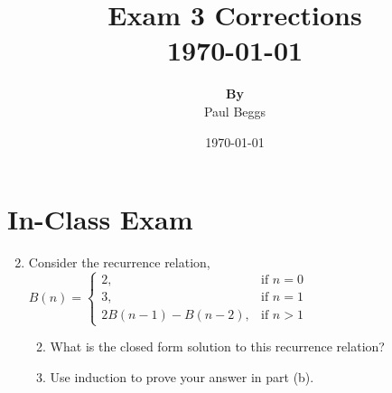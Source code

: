 \documentclass[10pt]{article}
\title{
  Exam 3 Corrections \\[1ex]
  \large \today
}
\author{\textbf{By} \\ 
Paul Beggs}
\date{\today} %
\newenvironment{solution}{\textit{Solution}.}
\newcommand{\solex}[1]{
    \vspace{5pt}
    \begin{solution}
    #1
    \end{solution}
}
\begin{document}
\maketitle

\section*{In-Class Exam}
\begin{enumerate}
    \setcounter{enumi}{1}
    \item Consider the recurrence relation,
          $B(n) = \begin{cases}
                  2,                & \text{if } n = 0 \\
                  3,                & \text{if } n = 1 \\
                  2B(n-1) - B(n-2), & \text{if } n > 1
              \end{cases}$
          \begin{enumerate}
              \setcounter{enumii}{1}
              \item What is the closed form solution to this recurrence relation? \\


              \item Use induction to prove your answer in part (b). \\

\end{enumerate}
\end{enumerate}
\end{document}
